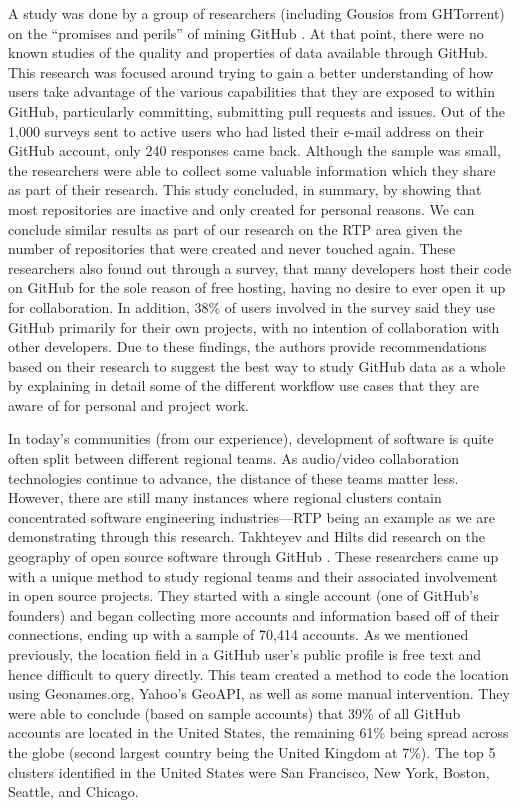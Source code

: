 A study was done by a group of researchers (including Gousios from GHTorrent) on the “promises and perils” of mining GitHub \cite{kalliamvakou_promises_2014}. At that point, there were no known studies of the quality and properties of data available through GitHub. This research was focused around trying to gain a better understanding of how users take advantage of the various capabilities that they are exposed to within GitHub, particularly committing, submitting pull requests and issues. Out of the 1,000 surveys sent to active users who had listed their e-mail address on their GitHub account, only 240 responses came back. Although the sample was small, the researchers were able to collect some valuable information which they share as part of their research. This study concluded, in summary, by showing that most repositories are inactive and only created for personal reasons. We can conclude similar results as part of our research on the RTP area given the number of repositories that were created and never touched again. These researchers also found out through a survey, that many developers host their code on GitHub for the sole reason of free hosting, having no desire to ever open it up for collaboration. In addition, 38\% of users involved in the survey said they use GitHub primarily for their own projects, with no intention of collaboration with other developers. Due to these findings, the authors provide recommendations based on their research to suggest the best way to study GitHub data as a whole by explaining in detail some of the different workflow use cases that they are aware of for personal and project work. 

In today's communities (from our experience), development of software is quite often split between different regional teams. As audio/video collaboration technologies continue to advance, the distance of these teams matter less. However, there are still many instances where regional clusters contain concentrated software engineering industries---RTP being an example as we are demonstrating through this research. Takhteyev and Hilts did research on the geography of open source software through GitHub \cite{takhteyev_investigating_2010}. These researchers came up with a unique method to study regional teams and their associated involvement in open source projects. They started with a single account (one of GitHub's founders) and began collecting more accounts and information based off of their connections, ending up with a sample of 70,414 accounts. As we mentioned previously, the location field in a GitHub user's public profile is free text and hence difficult to query directly. This team created a method to code the location using Geonames.org, Yahoo's GeoAPI, as well as some manual intervention. They were able to conclude (based on sample accounts) that 39\% of all GitHub accounts are located in the United States, the remaining 61\% being spread across the globe (second largest country being the United Kingdom at 7\%). The top 5 clusters identified in the United States were San Francisco, New York, Boston, Seattle, and Chicago.

